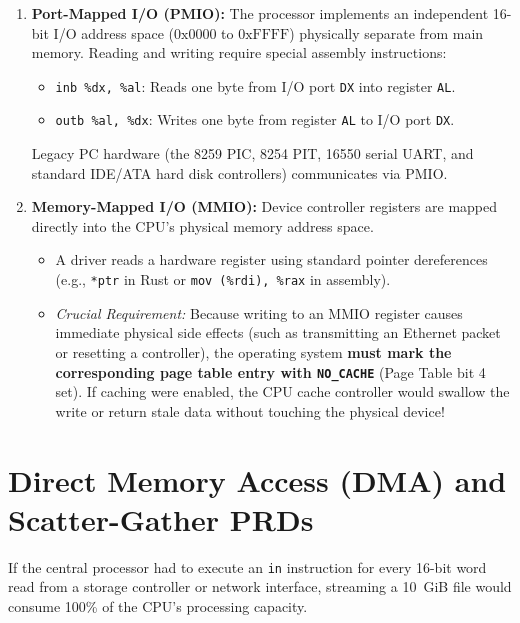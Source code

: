 \begin{enumerate}
    \item \textbf{Port-Mapped I/O (PMIO):} The processor implements an independent 16-bit I/O address space ($0\text{x}0000$ to $0\text{xFFFF}$) physically separate from main memory. Reading and writing require special assembly instructions:
    \begin{itemize}
        \item \texttt{inb \%dx, \%al}: Reads one byte from I/O port \texttt{DX} into register \texttt{AL}.
        \item \texttt{outb \%al, \%dx}: Writes one byte from register \texttt{AL} to I/O port \texttt{DX}.
    \end{itemize}
    Legacy PC hardware (the 8259 PIC, 8254 PIT, 16550 serial UART, and standard IDE/ATA hard disk controllers) communicates via PMIO.
    \item \textbf{Memory-Mapped I/O (MMIO):} Device controller registers are mapped directly into the CPU's physical memory address space.
    \begin{itemize}
        \item A driver reads a hardware register using standard pointer dereferences (e.g., \texttt{*ptr} in Rust or \texttt{mov (\%rdi), \%rax} in assembly).
        \item \textit{Crucial Requirement:} Because writing to an MMIO register causes immediate physical side effects (such as transmitting an Ethernet packet or resetting a controller), the operating system \textbf{must mark the corresponding page table entry with \texttt{NO\_CACHE}} (Page Table bit 4 set). If caching were enabled, the CPU cache controller would swallow the write or return stale data without touching the physical device!
    \end{itemize}
\end{enumerate}

\section{Direct Memory Access (DMA) and Scatter-Gather PRDs}
\label{sec:dma_deep}

If the central processor had to execute an \texttt{in} instruction for every 16-bit word read from a storage controller or network interface, streaming a 10~GiB file would consume 100\% of the CPU's processing capacity.


